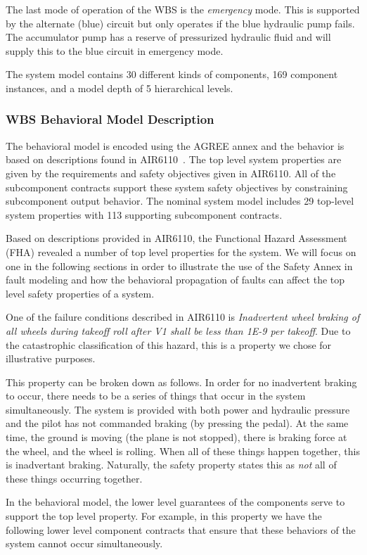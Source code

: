 The last mode of operation of the WBS is the \textit{emergency} mode. This is supported by the alternate (blue) circuit but only operates if the blue hydraulic pump fails. The accumulator pump has a reserve of pressurized hydraulic fluid and will supply this to the blue circuit in emergency mode.

The system model contains 30 different kinds of components, 169 component instances, and a model depth of 5 hierarchical levels. 

\subsubsection{WBS Behavioral Model Description}
The behavioral model is encoded using the AGREE annex and the behavior is based on descriptions found in AIR6110~\cite{AIR6110}. The top level system properties are given by the requirements and safety objectives given in AIR6110. All of the subcomponent contracts support these system safety objectives by constraining subcomponent output behavior. The nominal system model includes 29 top-level system properties with 113 supporting subcomponent contracts. 

Based on descriptions provided in AIR6110, the Functional Hazard Assessment (FHA) revealed a number of top level properties for the system. We will focus on one in the following sections in order to illustrate the use of the Safety Annex in fault modeling and how the behavioral propagation of faults can affect the top level safety properties of a system. 

One of the failure conditions described in AIR6110 is \textit{Inadvertent wheel braking of all wheels during takeoff roll after V1 shall be less than 1E-9 per takeoff}. Due to the catastrophic classification of this hazard, this is a property we chose for illustrative purposes. 


This property can be broken down as follows. In order for no inadvertent braking to occur, there needs to be a series of things that occur in the system simultaneously. The system is provided with both power and hydraulic pressure and the pilot has not commanded braking (by pressing the pedal). At the same time, the ground is moving (the plane is not stopped), there is braking force at the wheel, and the wheel is rolling.  When all of these things happen together, this is inadvertant braking. Naturally, the safety property states this as \textit{not} all of these things occurring together. 

In the behavioral model, the lower level guarantees of the components serve to support the top level property. For example, in this property we have the following lower level component contracts that ensure that these behaviors of the system cannot occur simultaneously.













